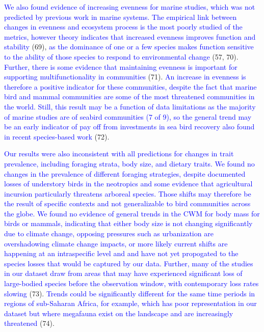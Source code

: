 \documentclass{article}
\begin{document}
\textcolor{blue}{We also found evidence of increasing evenness for marine studies, which was not predicted by previous work in marine systems. The empirical link between changes in evenness and ecosystem process is the most poorly studied of the metrics, however theory indicates that increased evenness improves function and stability }
(69),
\textcolor{blue}{as the dominance of one or a few species makes function sensitive to the ability of those species to respond to environmental change }(57,
70).
\textcolor{blue}{Further, there is some evidence that maintaining evenness is important for supporting multifunctionality in communities }(71).
\textcolor{blue}{An increase in evenness is therefore a positive indicator for these communities, despite the fact that marine bird and mammal communities are some of the most threatened communities in the world. Still, this result may be a function of data limitations as the majority of marine studies are of seabird communities (7 of 9), so the general trend may be an early indicator of pay off from investments in sea bird recovery also found in recent species-based work }(72).

\textcolor{blue}{Our results were also inconsistent with all predictions for changes in trait prevalence, including foraging strata, body size, and dietary traits. We found no changes in the prevalence of different foraging strategies, despite documented losses of understory birds in the neotropics and some evidence that agricultural incursion particularly threatens arboreal species. Those shifts may therefore be the result of specific contexts and not generalizable to bird communities across the globe. We found no evidence of general trends in the CWM for body mass for birds or mammals, indicating that either body size is not changing significantly due to climate change, opposing pressures such as urbanization are overshadowing climate change impacts, or more likely current shifts are happening at an intraspecific level and and have not yet propogated to the species losses that would be captured by our data. Further, many of the studies in our dataset draw from areas that may have experienced significant loss of large-bodied species before the observation window, with contemporary loss rates slowing}
(73).
\textcolor{blue}{Trends could be significantly different for the same time periods in regions of sub-Saharan Africa, for example, which has poor representation in our dataset but where megafauna exist on the landscape and are increasingly threatened}
(74).
\end{document}
